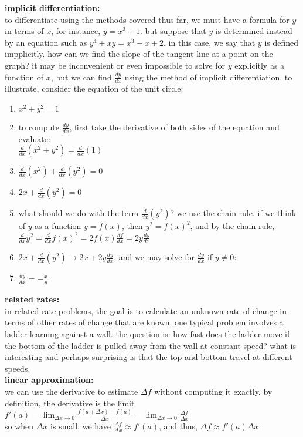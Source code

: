 \documentclass{article}
\begin{document}
\textbf{implicit differentiation:}\\
to differentiate using the methods covered thus far, we must have a formula for $y$ in terms of $x$, for instance, $y = x^3 + 1$. but suppose that $y$ is determined instead by an equation such as $y^4 + xy = x^3 - x + 2$. in this case, we say that $y$ is defined impplicitly. how can we find the slope of the tangent line at a point on the graph? it may be inconvenient or even impossible to solve for $y$ explicitly as a function of $x$, but we can find $\frac{dy}{dx}$ using the method of implicit differentiation. to illustrate, consider the equation of the unit circle:
	\begin{enumerate}
		\item $x^2 + y^2 = 1$
		\item to compute $\frac{dy}{dx}$, first take the derivative of both sides of the equation and evaluate: \\ $\frac{d}{dx}(x^2 + y^2) = \frac{d}{dx}(1)$
		\item $\frac{d}{dx}(x^2) + \frac{d}{dx}(y^2) = 0$
		\item $2x + \frac{d}{dx}(y^2) = 0$
		\item what should we do with the term $\frac{d}{dx}(y^2)$? we use the chain rule. if we think of $y$ as a function $y = f(x)$, then $y^2 = f(x)^2$, and by the chain rule,\\ $\frac{d}{dx}y^2 = \frac{d}{dx}f(x)^2 = 2f(x)\frac{df}{dx} = 2y\frac{dy}{dx}$
		\item $2x + \frac{d}{dx}(y^2)\to 2x + 2y\frac{dy}{dx}$, and we may solve for $\frac{dy}{dx}$ if $y \neq 0$:
		\item $\frac{dy}{dx} = -\frac{x}{y}$
	\end{enumerate}

\textbf{related rates:}\\
in related rate problems, the goal is to calculate an unknown rate of change in terms of other rates of change that are known. one typical problem involves a ladder learning against a wall. the question is: how fast does the ladder move if the bottom of the ladder is pulled away from the wall at constant speed? what is interesting and perhaps surprising is that the top and bottom travel at different speeds.\\

\textbf{linear approximation:}\\
we can use the derivative to estimate $\Delta f$ without computing it exactly. by definition, the derivative is the limit\\ $f'(a) = \lim_{\Delta x \to 0}\frac{f(a + \Delta x) - f(a)}{\Delta x} = \lim_{\Delta x \to 0}\frac{\Delta f}{\Delta x}$\\ so when $\Delta x$ is small, we have $\frac{\Delta f}{\Delta x} \approx f'(a)$, and thus, $\Delta f \approx f'(a)\Delta x$\\
\end{document}
